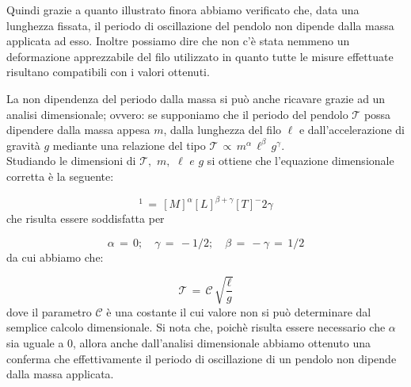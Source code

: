 Quindi grazie a quanto illustrato finora abbiamo verificato che, data una lunghezza fissata, il periodo di oscillazione del pendolo non dipende dalla massa applicata ad esso. Inoltre possiamo dire che non c'è stata nemmeno un deformazione apprezzabile del filo utilizzato in quanto tutte le misure effettuate risultano compatibili con i valori ottenuti.

La non dipendenza del periodo dalla massa si può anche ricavare grazie ad un analisi dimensionale; ovvero: se supponiamo che il periodo del pendolo $\mathcal{T}$ possa dipendere dalla massa appesa $m$, dalla lunghezza del filo $\ell$ e dall'accelerazione di gravità $g$ mediante una relazione del tipo $\mathcal{T} \,\propto\, m^\alpha \, \ell^\beta \, g^\gamma$.\\
Studiando le dimensioni di $\mathcal{T}, \,\, m, \,\, \ell \,\,e\,\, g$ si ottiene che l'equazione dimensionale corretta è la seguente:

\begin{equation*}
	[T]^1 \,=\, [M]^\alpha[L]^{\beta+\gamma}[T]^-2\gamma 
\end{equation*}
%
che risulta essere soddisfatta per

\begin{equation*}
	\alpha \,=\, 0; \quad \gamma \,=\, -1/2; \quad \beta \,=\, -\gamma \,=\, 1/2 
\end{equation*}
%
da cui abbiamo che:

\begin{equation*}
	\mathcal{T} \,=\, \mathcal{C} \, \sqrt{\frac{\ell}{g}}
\end{equation*}
%
dove il parametro $\mathcal{C}$ è una costante il cui valore non si può determinare dal semplice calcolo dimensionale. Si nota che, poichè risulta essere necessario che $\alpha$ sia uguale a 0, allora anche dall'analisi dimensionale abbiamo ottenuto una conferma che effettivamente il periodo di oscillazione di un pendolo non dipende dalla massa applicata.
